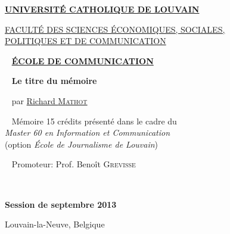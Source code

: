 
\begin{center}

\Large \href{http://www.uclouvain.be/}{\textbf{UNIVERSITÉ CATHOLIQUE DE LOUVAIN}}

\large \href{http://www.uclouvain.be/espo}{FACULTÉ DES SCIENCES ÉCONOMIQUES, SOCIALES, \\
POLITIQUES ET DE COMMUNICATION}

~ \vfill
\large \href{http://www.uclouvain.be/comu}{\textbf{ÉCOLE DE COMMUNICATION}}

~ \vfill
\huge\textbf{Le titre du mémoire}%

~ \vfill
\large par \href{mailto:richard.mathot@gmail.com}{Richard \textsc{Mathot}}

~ \vfill
\normalsize Mémoire 15 crédits présenté dans le cadre du \\
\emph{Master 60 en Information et Communication}\\
(option \emph{École de Journalisme de Louvain})

\end{center}


~ \vfill
\hspace{6cm} Promoteur: Prof. Benoît \textsc{Grevisse}



~ \vfill

\begin{center}
\normalsize \textbf{Session de septembre 2013}

Louvain-la-Neuve, Belgique
\end{center}

\thispagestyle{empty}


